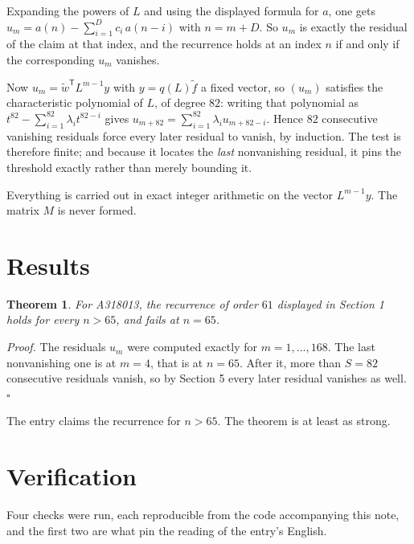 \documentclass[11pt]{article}
\newtheorem{theorem}{Theorem}
\theoremstyle{definition}
\begin{document}
Expanding the powers of $L$ and using the displayed formula for $a$, one gets $u_m = a(n) - \sum_{i=1}^{D} c_i\,a(n-i)$ with $n = m + D$. So $u_m$ is exactly the residual of the claim at that index, and the recurrence holds at an index $n$ if and only if the corresponding $u_m$ vanishes.

Now $u_m = \tilde w^{\mathsf T} L^{m-1} y$ with $y = q(L)\tilde f$ a fixed vector, so $(u_m)$ satisfies the characteristic polynomial of $L$, of degree $82$: writing that polynomial as $t^{82} - \sum_{i=1}^{82} \lambda_i t^{82-i}$ gives $u_{m+82} = \sum_{i=1}^{82} \lambda_i u_{m+82-i}$. Hence $82$ consecutive vanishing residuals force every later residual to vanish, by induction. The test is therefore finite; and because it locates the {\itshape last} nonvanishing residual, it pins the threshold exactly rather than merely bounding it.

Everything is carried out in exact integer arithmetic on the vector $L^{m-1}y$. The matrix $M$ is never formed.

\section{Results}

\begin{theorem} For A318013, the recurrence of order $61$ displayed in Section 1 holds for every $n > 65$, and fails at $n = 65$.\end{theorem}

{\itshape Proof.} The residuals $u_m$ were computed exactly for $m = 1,\dots,168$. The last nonvanishing one is at $m = 4$, that is at $n = 65$. After it, more than $S = 82$ consecutive residuals vanish, so by Section 5 every later residual vanishes as well. $\square$

The entry claims the recurrence for $n > 65$. The theorem is at least as strong.

\section{Verification}

Four checks were run, each reproducible from the code accompanying this note, and the first two are what pin the reading of the entry's English.
\end{document}
